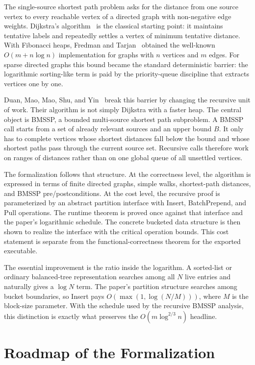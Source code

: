 \documentclass[11pt,a4paper]{article}
\begin{document}
The single-source shortest path problem asks for the distance from one source
vertex to every reachable vertex of a directed graph with non-negative edge
weights.  Dijkstra's algorithm~\cite{Dijkstra1959} is the classical starting
point: it maintains tentative labels and repeatedly settles a vertex of
minimum tentative distance.  With Fibonacci heaps, Fredman and
Tarjan~\cite{FredmanTarjan1987} obtained the well-known
\(O(m+n\log n)\) implementation for graphs with \(n\) vertices and \(m\)
edges.  For sparse directed graphs this bound became the standard deterministic
barrier: the logarithmic sorting-like term is paid by the priority-queue
discipline that extracts vertices one by one.

Duan, Mao, Mao, Shu, and Yin~\cite{DuanMaoMaoShuYin2025} break this barrier
by changing the recursive unit of work.  Their algorithm is not simply
Dijkstra with a faster heap.  The central object is BMSSP, a bounded
multi-source shortest path subproblem.  A BMSSP call starts from a set of
already relevant sources and an upper bound \(B\).  It only has to complete
vertices whose shortest distances fall below the bound and whose shortest
paths pass through the current source set.  Recursive calls therefore work on
ranges of distances rather than on one global queue of all unsettled vertices.

The formalization follows that structure.  At the correctness level, the
algorithm is expressed in terms of finite directed graphs, simple walks,
shortest-path distances, and BMSSP pre/postconditions.  At the cost level, the
recursive proof is parameterized by an abstract partition interface with
Insert, BatchPrepend, and Pull operations.  The runtime theorem is proved once
against that interface and the paper's logarithmic schedule.  The concrete
bucketed data structure is then shown to realize the interface with the
critical operation bounds.  This cost statement is separate from the
functional-correctness theorem for the exported executable.

The essential improvement is the ratio inside the logarithm.  A sorted-list
or ordinary balanced-tree representation searches among all \(N\) live
entries and naturally gives a \(\log N\) term.  The paper's partition
structure searches among bucket boundaries, so Insert pays
\(O(\max(1,\log(N/M)))\), where \(M\) is the block-size parameter.  With the
schedule used by the recursive BMSSP analysis, this distinction is exactly
what preserves the \(O(m \log^{2/3} n)\) headline.

\section{Roadmap of the Formalization}
\end{document}
